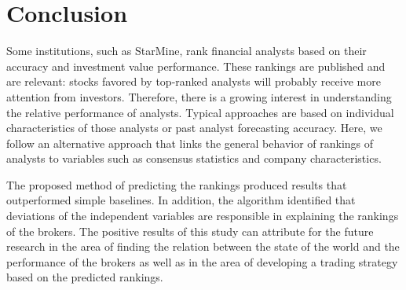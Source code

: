 

\section{Conclusion}
\label{sec:conclusion}
Some institutions, such as StarMine, rank financial analysts based on their accuracy and investment value performance. These rankings are published and are relevant: stocks favored by top-ranked analysts will probably receive more attention from investors. Therefore, there is a growing interest in understanding the relative performance of analysts. Typical approaches are based on individual characteristics of those analysts or past analyst forecasting accuracy. Here, we follow an alternative approach that links the general behavior of rankings of analysts to variables such as consensus statistics and company characteristics.


The proposed method of predicting the rankings produced  results that outperformed simple  baselines. In addition, the algorithm identified that deviations of the independent variables are responsible in explaining the rankings of the brokers. The positive results of this study can attribute for the future research in the area of finding the relation between the state of the world and the performance of the brokers as well as  in the area of developing a trading strategy based on the predicted rankings.


